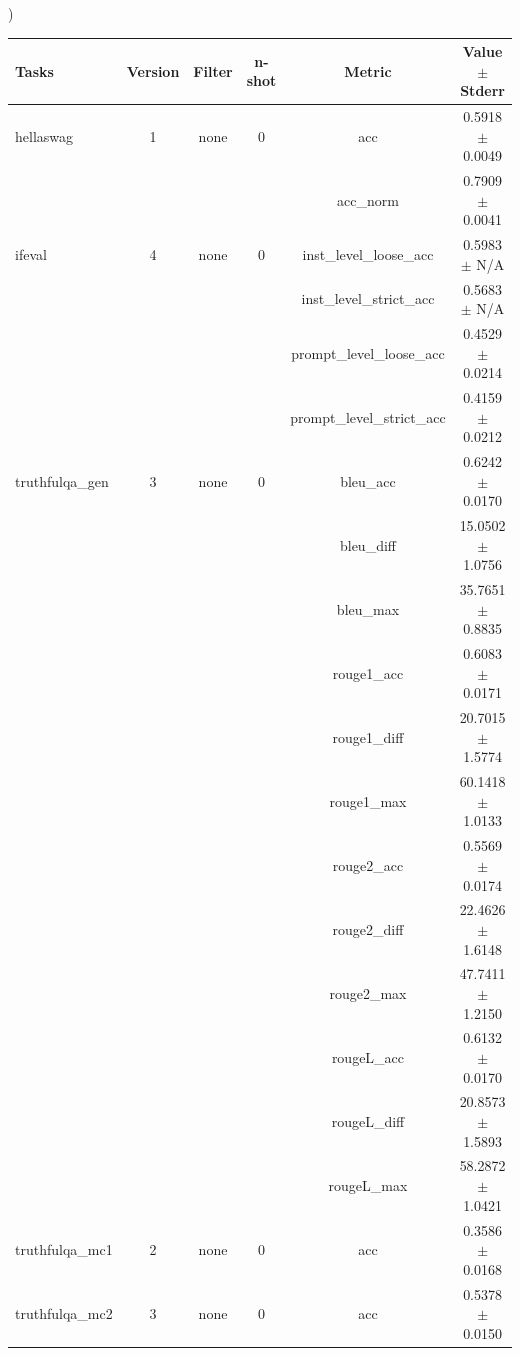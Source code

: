 \documentclass{ifacconf}
\begin{document}
\begin{strip}
\begin{minipage}{\textwidth}
    \begin{table}[H]
    \centering
    )
    \begin{tabular}{|l|c|c|c|c|c|}
    \hline
    \textbf{Tasks} & \textbf{Version} & \textbf{Filter} & \textbf{n-shot} & \textbf{Metric} & \textbf{Value} $\pm$ \textbf{Stderr} \\ \hline
    hellaswag & 1 & none & 0 & acc & 0.5918 $\pm$ 0.0049 \\ \hline
    & & & & acc\_norm & 0.7909 $\pm$ 0.0041 \\ \hline
    ifeval & 4 & none & 0 & inst\_level\_loose\_acc & 0.5983 $\pm$ N/A \\ \hline
    & & & & inst\_level\_strict\_acc & 0.5683 $\pm$ N/A \\ \hline
    & & & & prompt\_level\_loose\_acc & 0.4529 $\pm$ 0.0214 \\ \hline
    & & & & prompt\_level\_strict\_acc & 0.4159 $\pm$ 0.0212 \\ \hline
    truthfulqa\_gen & 3 & none & 0 & bleu\_acc & 0.6242 $\pm$ 0.0170 \\ \hline
    & & & & bleu\_diff & 15.0502 $\pm$ 1.0756 \\ \hline
    & & & & bleu\_max & 35.7651 $\pm$ 0.8835 \\ \hline
    & & & & rouge1\_acc & 0.6083 $\pm$ 0.0171 \\ \hline
    & & & & rouge1\_diff & 20.7015 $\pm$ 1.5774 \\ \hline
    & & & & rouge1\_max & 60.1418 $\pm$ 1.0133 \\ \hline
    & & & & rouge2\_acc & 0.5569 $\pm$ 0.0174 \\ \hline
    & & & & rouge2\_diff & 22.4626 $\pm$ 1.6148 \\ \hline
    & & & & rouge2\_max & 47.7411 $\pm$ 1.2150 \\ \hline
    & & & & rougeL\_acc & 0.6132 $\pm$ 0.0170 \\ \hline
    & & & & rougeL\_diff & 20.8573 $\pm$ 1.5893 \\ \hline
    & & & & rougeL\_max & 58.2872 $\pm$ 1.0421 \\ \hline
    truthfulqa\_mc1 & 2 & none & 0 & acc & 0.3586 $\pm$ 0.0168 \\ \hline
    truthfulqa\_mc2 & 3 & none & 0 & acc & 0.5378 $\pm$ 0.0150 \\ \hline
    \end{tabular}
    \label{tab:llama31_q6k}
    \end{table}
\end{minipage}
\end{strip}
\end{document}
